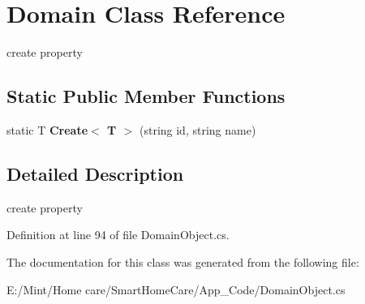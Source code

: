 \hypertarget{class_domain}{\section{Domain Class Reference}
\label{class_domain}
}


create property  


\subsection*{Static Public Member Functions}
\begin{DoxyCompactItemize}
\item 
\hypertarget{class_domain_a7ad22ab73a4267af16f71e9add5e9eba}{static T {\bfseries Create$<$ T $>$} (string id, string name)}\label{class_domain_a7ad22ab73a4267af16f71e9add5e9eba}

\end{DoxyCompactItemize}


\subsection{Detailed Description}
create property 

Definition at line 94 of file Domain\-Object.\-cs.



The documentation for this class was generated from the following file\-:\begin{DoxyCompactItemize}
\item 
E\-:/\-Mint/\-Home care/\-Smart\-Home\-Care/\-App\-\_\-\-Code/Domain\-Object.\-cs\end{DoxyCompactItemize}
